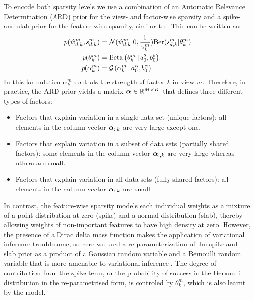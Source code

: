 \documentclass[10pt, a4paper,openany]{report}
\begin{document}
To encode both sparsity levels we use a combination of an Automatic Relevance Determination (ARD) prior for the view- and factor-wise sparsity and a spike-and-slab prior for the feature-wise sparsity, similar to \cite{khan2014identification}. This can be written as:   
\begin{align}
\label{eq:wprior}
p(\hat{w}_{d,k}^m,s_{d,k}^m) &= \mathcal{N} (\hat{w}_{d,k}^m | 0, \frac{1}{\alpha_k^m}) \text{Ber}(s_{d,k}^m|\theta_k^m)\\
p(\theta_k^m) &= \text{Beta}\left(\theta_k^m \,|\, a_0^\theta,b_0^\theta\right)\\
p(\alpha_k^m) &= \mathcal{G}\left(\alpha_k^m \,|\, a_0^\alpha, b_0^\alpha\right)
\end{align}
In this formulation $\alpha_k^m$ controls the strength of factor $k$ in view $m$. Therefore, in practice, the ARD prior yields a matrix $\mbox{\boldmath $\alpha$} \in \mathbb{R}^{M \times K}$ that defines three different types of factors:
\begin{itemize}
	\item Factors that explain variation in a single data set (unique factors): all elements in the column vector $\mbox{\boldmath $\alpha$}_{:,k}$ are very large except one.
	\item Factors that explain variation in a subset of data sets (partially shared factors): some elements in the column vector $\mbox{\boldmath $\alpha$}_{:,k}$ are very large whereas others are small.
	\item Factors that explain variation in all data sets (fully shared factors): all elements in the column vector $\mbox{\boldmath $\alpha$}_{:,k}$ are small.
\end{itemize}
In contrast, the feature-wise sparsity models each individual weights as a mixture of a point distribution at zero (spike) and a normal distribution (slab), thereby allowing weights of non-important features to have high density at zero. However, the presence of a Dirac delta mass function makes the application of variational inference troublesome, so here we used a re-parameterization of the spike and slab prior as a product of a Gaussian random variable and a Bernoulli random variable that is more amenable to variational inference \cite{titsias2011spike}.  The degree of contribution from the spike term, or the probability of success in the Bernoulli distribution in the re-parametrised form,  is controled by $\theta_k^m$, which is also learnt by the model.\\
\end{document}
